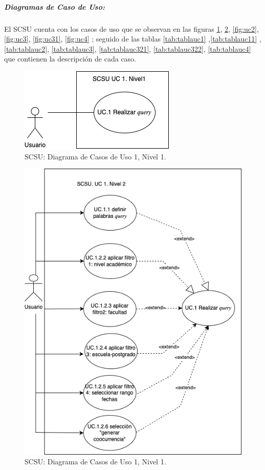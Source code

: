 \documentclass[
  12pt,
  openany]{book}
\begin{document}
\hypertarget{diagramas-de-caso-de-uso}{%
\subparagraph{Diagramas de Caso de Uso:}\label{diagramas-de-caso-de-uso}}

El SCSU cuenta con los casos de uso que se observan en las figuras \ref{fig:uc1}, \ref{fig:uc12}, \ref{fig:uc2}, \ref{fig:uc3}, \ref{fig:uc31}, \ref{fig:uc4} ; seguido de las tablas \ref{tab:tablauc1} ,\ref{tab:tablauc11} , \ref{tab:tablauc2}, \ref{tab:tablauc3}, \ref{tab:tablauc321}, \ref{tab:tablauc322}, \ref{tab:tablauc4} que contienen la descripción de cada caso.

\begin{figure}

{\centering \includegraphics[width=0.4\linewidth]{images/05-desarrollo/4_ciclo/UC/SCSU_UC1_nivel1} 

}

\caption{SCSU: Diagrama de Casos de Uso 1, Nivel 1.}\label{fig:uc1}
\end{figure}

\begin{figure}

{\centering \includegraphics[width=0.5\linewidth]{images/05-desarrollo/4_ciclo/UC/SCSU_UC1_nivel2} 

}

\caption{SCSU: Diagrama de Casos de Uso 1, Nivel 1.}\label{fig:uc12}
\end{figure}
\end{document}
